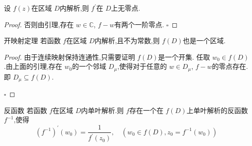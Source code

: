 \documentclass[../../复变函数.tex]{subfiles}
\begin{document}
\begin{theorem}
    设 \(   f\left( z \right)   \)在区域 \(  D  \)内解析,则 \(  f^{\prime}   \)在 \(  D  \)上无零点.  
\end{theorem}
\begin{proof}
    否则由引理,存在 \(  w \in \mathbb{C}   \),  \(  f-w  \)有两个一阶零点. 
    \hfill $\square$
\end{proof}

\begin{theorem}{开映射定理}
    若函数 \(  f  \)在区域 \(  D  \)内解析,且不为常数,则 \(  f\left( D \right)   \)也是一个区域.       
\end{theorem}
\begin{proof}
    由于连续映射保持连通性,只需要证明 \(  f\left( D \right)   \)是一个开集. 任取 \(  w_0 \in f\left( D \right)   \).由上面的引理,存在 \(  w_0  \)的一个邻域 \(  D_{\mu }  \),使得对于任意的 \(  w \in D_{\mu }  \), \(  f-w  \)的零点存在. 即 \(  D_{\mu }\subseteq f\left( D \right)   \).      

    \hfill $\square$
\end{proof}

\begin{theorem}{反函数}
    若函数 \(  f  \)在区域 \(  D  \)内单叶解析.则  \(  f  \)存在一个在 \(  f\left( D \right)   \)上单叶解析的反函数 \(  f^{-1}   \),使得 \[
    \left( f^{-1}  \right)^{\prime} \left( w_0 \right)= \frac{1 }{f^{\prime} \left( z_0 \right)  },\quad \left( w_0\in f\left( D \right),z_0 = f^{-1} \left( w_0 \right)      \right) 
    \]     
\end{theorem}
\end{document}

